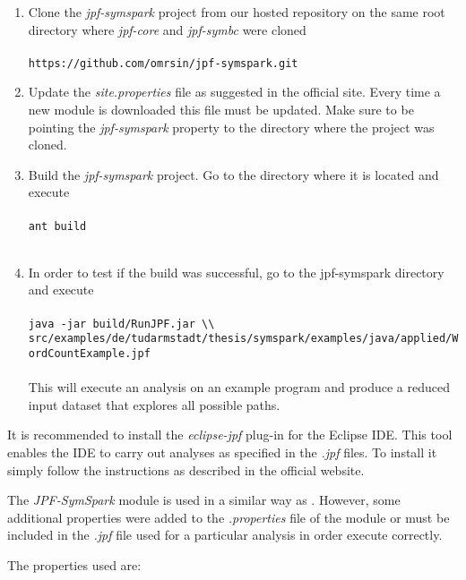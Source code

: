\begin{enumerate}
	\item Clone the \textit{jpf-symspark} project from our hosted repository on the same root directory where \textit{jpf-core} and \textit{jpf-symbc} were cloned \\ \\
	\lstinline[]|https://github.com/omrsin/jpf-symspark.git|
	\item Update the \textit{site.properties} file as suggested in the official \jpf{} site. Every time a new module is downloaded this file must be updated. Make sure to be pointing the \textit{jpf-symspark} property to the directory where the project was cloned.	
	\item Build the \textit{jpf-symspark} project. Go to the directory where it is located and execute \\ \\		
	\lstinline[]|ant build| \\ \\	
	\item In order to test if the build was successful, go to the jpf-symspark directory and execute \\ \\
		\lstinline[]|java -jar build/RunJPF.jar \\| \\
		\hspace{2cm} \lstinline[]|src/examples/de/tudarmstadt/thesis/symspark/examples/java/applied/WordCountExample.jpf| \\ \\
	This will execute an analysis on an example program and produce a reduced input dataset that explores all possible paths.
\end{enumerate}

It is recommended to install the \textit{eclipse-jpf} plug-in for the Eclipse IDE. This tool enables the IDE to carry out analyses as specified in the \textit{.jpf} files. To install it simply follow the instructions as described in the official \jpf{} website. 


The \textit{JPF-SymSpark} module is used in a similar way as \spf{}. However, some additional properties were added to the \textit{.properties} file of the module or must be included in the \textit{.jpf} file used for a particular analysis in order execute correctly.

The properties used are:

